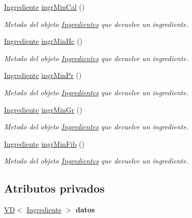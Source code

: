 \begin{DoxyCompactItemize}
\hyperlink{classIngrediente}{Ingrediente} \hyperlink{classIngredientes_ac47f94d2dc7085be44be5b434665ba4d}{ingr\+Min\+Cal} ()
\begin{DoxyCompactList}\small\item\em Metodo del objeto \hyperlink{classIngredientes}{Ingredientes} que devuelve un ingrediente. \end{DoxyCompactList}\item 
\hyperlink{classIngrediente}{Ingrediente} \hyperlink{classIngredientes_ae65cd2b1b7e0cc14487c3d9faf718344}{ingr\+Min\+Hc} ()
\begin{DoxyCompactList}\small\item\em Metodo del objeto \hyperlink{classIngredientes}{Ingredientes} que devuelve un ingrediente. \end{DoxyCompactList}\item 
\hyperlink{classIngrediente}{Ingrediente} \hyperlink{classIngredientes_a9a2a79d11677030108f3f4147ed748df}{ingr\+Min\+Pr} ()
\begin{DoxyCompactList}\small\item\em Metodo del objeto \hyperlink{classIngredientes}{Ingredientes} que devuelve un ingrediente. \end{DoxyCompactList}\item 
\hyperlink{classIngrediente}{Ingrediente} \hyperlink{classIngredientes_a17b17c5d77d5537911e49c234b280221}{ingr\+Min\+Gr} ()
\begin{DoxyCompactList}\small\item\em Metodo del objeto \hyperlink{classIngredientes}{Ingredientes} que devuelve un ingrediente. \end{DoxyCompactList}\item 
\hyperlink{classIngrediente}{Ingrediente} \hyperlink{classIngredientes_a3ae4408bbffc06b34ef9aa969e4113b6}{ingr\+Min\+Fib} ()
\begin{DoxyCompactList}\small\item\em Metodo del objeto \hyperlink{classIngredientes}{Ingredientes} que devuelve un ingrediente. \end{DoxyCompactList}\end{DoxyCompactItemize}
\subsection*{Atributos privados}
\begin{DoxyCompactItemize}
\item 
\mbox{\label{classIngredientes_a6cd13050a0278690fa6585d7b9f1f823}} 
\hyperlink{classVD}{VD}$<$ \hyperlink{classIngrediente}{Ingrediente} $>$ {\bfseries datos}
\end{DoxyCompactItemize}
